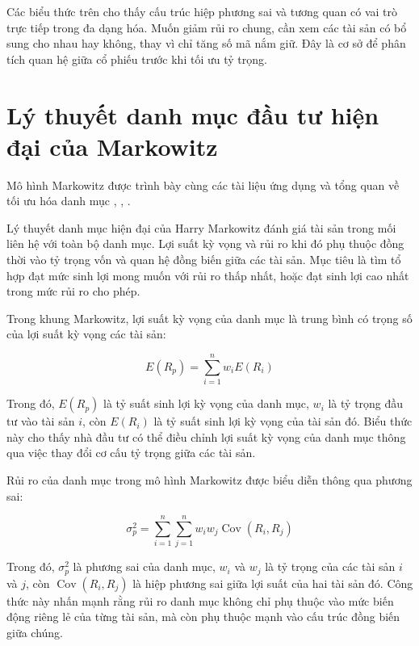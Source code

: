 \documentclass[12pt,a4paper,openany,oneside]{book}
\begin{document}
Các biểu thức trên cho thấy cấu trúc hiệp phương sai và tương quan có vai trò trực tiếp trong đa dạng hóa. Muốn giảm rủi ro chung, cần xem các tài sản có bổ sung cho nhau hay không, thay vì chỉ tăng số mã nắm giữ. Đây là cơ sở để phân tích quan hệ giữa cổ phiếu trước khi tối ưu tỷ trọng.

\section{Lý thuyết danh mục đầu tư hiện đại của Markowitz}\label{Toc227188421}
Mô hình Markowitz được trình bày cùng các tài liệu ứng dụng và tổng quan về tối ưu hóa danh mục \cite{ref03}, \cite{ref10}, \cite{ref11}.

Lý thuyết danh mục hiện đại của Harry Markowitz đánh giá tài sản trong mối liên hệ với toàn bộ danh mục. Lợi suất kỳ vọng và rủi ro khi đó phụ thuộc đồng thời vào tỷ trọng vốn và quan hệ đồng biến giữa các tài sản. Mục tiêu là tìm tổ hợp đạt mức sinh lợi mong muốn với rủi ro thấp nhất, hoặc đạt sinh lợi cao nhất trong mức rủi ro cho phép.

Trong khung Markowitz, lợi suất kỳ vọng của danh mục là trung bình có trọng số của lợi suất kỳ vọng các tài sản:

\begin{equation}\label{eq:theory-09}
E\left({R}_{p}\right)=\sum_{i=1}^{n}{{w}_{i}E\left({R}_{i}\right)}
\end{equation}

Trong đó, \(E\left({R}_{p}\right)\) là tỷ suất sinh lợi kỳ vọng của danh mục, \({w}_{i}\) là tỷ trọng đầu tư vào tài sản \(i\), còn \(E\left({R}_{i}\right)\) là tỷ suất sinh lợi kỳ vọng của tài sản đó. Biểu thức này cho thấy nhà đầu tư có thể điều chỉnh lợi suất kỳ vọng của danh mục thông qua việc thay đổi cơ cấu tỷ trọng giữa các tài sản.

Rủi ro của danh mục trong mô hình Markowitz được biểu diễn thông qua phương sai:

\begin{equation}\label{eq:theory-10}
{\sigma}_{p}^{2}=\sum_{i=1}^{n}{\sum_{j=1}^{n}{{w}_{i}{w}_{j}}\operatorname{Cov}\left({R}_{i},{R}_{j}\right)}
\end{equation}

Trong đó, \({\sigma}_{p}^{2}\) là phương sai của danh mục, \({w}_{i}\) và \({w}_{j}\) là tỷ trọng của các tài sản \(i\) và \(j\), còn \(\operatorname{Cov}\left({R}_{i},{R}_{j}\right)\) là hiệp phương sai giữa lợi suất của hai tài sản đó. Công thức này nhấn mạnh rằng rủi ro danh mục không chỉ phụ thuộc vào mức biến động riêng lẻ của từng tài sản, mà còn phụ thuộc mạnh vào cấu trúc đồng biến giữa chúng.
\end{document}
